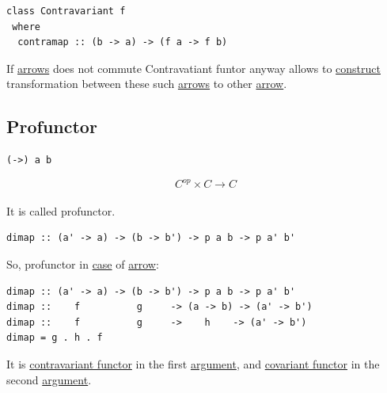 \documentclass[11pt]{article}
\begin{document}
\begin{verbatim}
class Contravariant f
 where
  contramap :: (b -> a) -> (f a -> f b)
\end{verbatim}


If \hyperref[org9c45dc6]{arrows} does not commute Contravatiant funtor anyway allows to \hyperref[org3eb9b19]{construct} transformation between these such \hyperref[org9c45dc6]{arrows} to other \hyperref[org03967f4]{arrow}.\\

\subsection{Profunctor}
\label{sec:org9075fd1}

\begin{verbatim}
(->) a b
\end{verbatim}

$$ C^{op} \times C \to C $$\\

It is called profunctor.\\

\begin{verbatim}
dimap :: (a' -> a) -> (b -> b') -> p a b -> p a' b'
\end{verbatim}

So, profunctor in \hyperref[org41d12b6]{case} of \hyperref[org03967f4]{arrow}:\\


\begin{verbatim}
dimap :: (a' -> a) -> (b -> b') -> p a b -> p a' b'
dimap ::    f          g     -> (a -> b) -> (a' -> b') 
dimap ::    f          g     ->    h    -> (a' -> b')
dimap = g . h . f
\end{verbatim}

It is \hyperref[orge5e36a5]{contravariant functor} in the first \hyperref[orga6b7e97]{argument}, and \hyperref[orgf6f99b5]{covariant functor} in the second \hyperref[orga6b7e97]{argument}.\\
\end{document}
